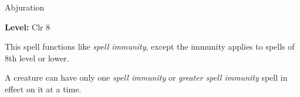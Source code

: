 \label{spell:Greater Spell Immunity}

Abjuration

\textbf{Level:} Clr 8

This spell functions like \textit{spell immunity}, except the immunity applies 
to spells of 8th level or lower.

A creature can have only one \textit{spell immunity} or \textit{greater spell immunity 
}spell in effect on it at a time.

